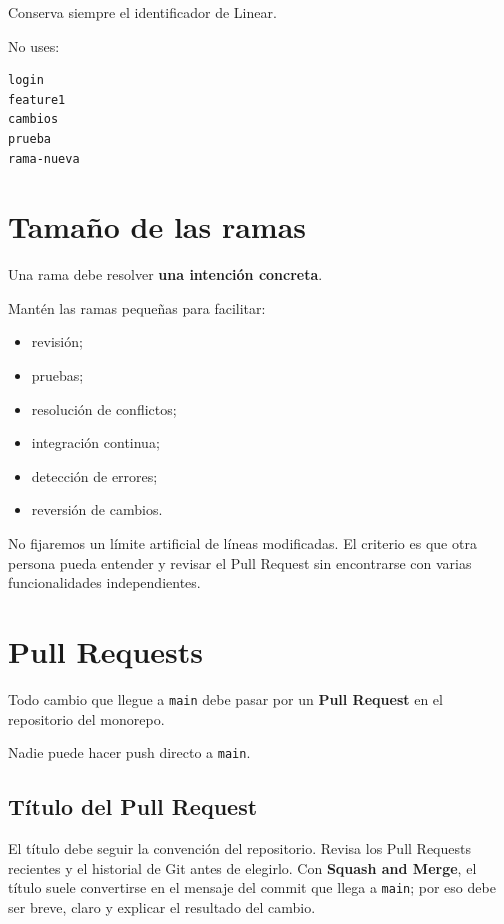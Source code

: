 \documentclass[11pt,a4paper]{article}
\begin{document}
Conserva siempre el identificador de Linear.

No uses:

\begin{lstlisting}
login
feature1
cambios
prueba
rama-nueva
\end{lstlisting}


\section{Tamaño de las ramas}

Una rama debe resolver \textbf{una intención concreta}.

Mantén las ramas pequeñas para facilitar:

\begin{itemize}
  \item revisión;
  \item pruebas;
  \item resolución de conflictos;
  \item integración continua;
  \item detección de errores;
  \item reversión de cambios.
\end{itemize}

No fijaremos un límite artificial de líneas modificadas. El criterio es que otra
persona pueda entender y revisar el Pull Request sin encontrarse con varias
funcionalidades independientes.


\section{Pull Requests}

Todo cambio que llegue a \texttt{main} debe pasar por un \textbf{Pull Request}
en el repositorio del monorepo.

Nadie puede hacer push directo a \texttt{main}.

\subsection{Título del Pull Request}

El título debe seguir la convención del repositorio. Revisa los Pull Requests
recientes y el historial de Git antes de elegirlo. Con \textbf{Squash and
Merge}, el título suele convertirse en el mensaje del commit que llega a
\texttt{main}; por eso debe ser breve, claro y explicar el resultado del cambio.
\end{document}
